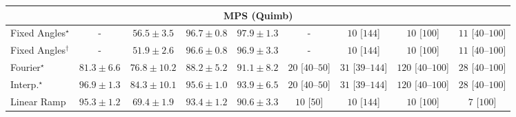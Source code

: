 \begin{tabular}{l|cccc|cccc|}
\cline{1-9}
\multicolumn{9}{c}{\rule{0pt}{8pt}MPS (Quimb)} \\
\midrule
Fixed Angles$^\star$ & {\cellcolor[HTML]{000000}} \color[HTML]{F1F1F1} {\cellcolor{white}} \color{black} - & {\cellcolor[HTML]{FFF9C5}} \color[HTML]{000000} $56.5\pm 3.5$ & {\cellcolor[HTML]{712806}} \color[HTML]{F1F1F1} $96.7\pm 0.8$ & {\cellcolor[HTML]{662506}} \color[HTML]{F1F1F1} $97.9\pm 1.3$ & {\cellcolor[HTML]{000000}} \color[HTML]{F1F1F1} {\cellcolor{white}} \color{black} - & {\cellcolor[HTML]{FFF7F3}} \color[HTML]{000000} $10$ [$144$] & {\cellcolor[HTML]{FFF7F3}} \color[HTML]{000000} $10$ [$100$] & {\cellcolor[HTML]{FFF6F2}} \color[HTML]{000000} $11$ [$40$--$100$] \\
Fixed Angles$^\dagger$ & {\cellcolor[HTML]{000000}} \color[HTML]{F1F1F1} {\cellcolor{white}} \color{black} - & {\cellcolor[HTML]{FFFFE5}} \color[HTML]{000000} $51.9\pm 2.6$ & {\cellcolor[HTML]{712806}} \color[HTML]{F1F1F1} $96.6\pm 0.8$ & {\cellcolor[HTML]{702806}} \color[HTML]{F1F1F1} $96.9\pm 3.3$ & {\cellcolor[HTML]{000000}} \color[HTML]{F1F1F1} {\cellcolor{white}} \color{black} - & {\cellcolor[HTML]{FFF7F3}} \color[HTML]{000000} $10$ [$144$] & {\cellcolor[HTML]{FFF7F3}} \color[HTML]{000000} $10$ [$100$] & {\cellcolor[HTML]{FFF6F2}} \color[HTML]{000000} $11$ [$40$--$100$] \\
Fourier$^\star$ & {\cellcolor[HTML]{E86C12}} \color[HTML]{F1F1F1} $81.3\pm 6.6$ & {\cellcolor[HTML]{F88B22}} \color[HTML]{F1F1F1} $76.8\pm 10.2$ & {\cellcolor[HTML]{BC4503}} \color[HTML]{F1F1F1} $88.2\pm 5.2$ & {\cellcolor[HTML]{A33904}} \color[HTML]{F1F1F1} $91.1\pm 8.2$ & {\cellcolor[HTML]{FFF4F0}} \color[HTML]{000000} $20$ [$40$--$50$] & {\cellcolor[HTML]{FFF2EE}} \color[HTML]{000000} $31$ [$39$--$144$] & {\cellcolor[HTML]{FDDCD8}} \color[HTML]{000000} $120$ [$40$--$100$] & {\cellcolor[HTML]{FFF3EF}} \color[HTML]{000000} $28$ [$40$--$100$] \\
Interp.$^\star$ & {\cellcolor[HTML]{702806}} \color[HTML]{F1F1F1} $96.9\pm 1.3$ & {\cellcolor[HTML]{D85A09}} \color[HTML]{F1F1F1} $84.3\pm 10.1$ & {\cellcolor[HTML]{7B2B05}} \color[HTML]{F1F1F1} $95.6\pm 1.0$ & {\cellcolor[HTML]{892F05}} \color[HTML]{F1F1F1} $93.9\pm 6.5$ & {\cellcolor[HTML]{FFF4F0}} \color[HTML]{000000} $20$ [$40$--$50$] & {\cellcolor[HTML]{FFF2EE}} \color[HTML]{000000} $31$ [$39$--$144$] & {\cellcolor[HTML]{FDDCD8}} \color[HTML]{000000} $120$ [$40$--$100$] & {\cellcolor[HTML]{FFF3EF}} \color[HTML]{000000} $28$ [$40$--$100$] \\
Linear Ramp & {\cellcolor[HTML]{7C2C05}} \color[HTML]{F1F1F1} $95.3\pm 1.2$ & {\cellcolor[HTML]{FEC24D}} \color[HTML]{000000} $69.4\pm 1.9$ & {\cellcolor[HTML]{8E3104}} \color[HTML]{F1F1F1} $93.4\pm 1.2$ & {\cellcolor[HTML]{A83B03}} \color[HTML]{F1F1F1} $90.6\pm 3.3$ & {\cellcolor[HTML]{FFF7F3}} \color[HTML]{000000} $10$ [$50$] & {\cellcolor[HTML]{FFF7F3}} \color[HTML]{000000} $10$ [$144$] & {\cellcolor[HTML]{FFF7F3}} \color[HTML]{000000} $10$ [$100$] & {\cellcolor[HTML]{FFF7F3}} \color[HTML]{000000} $7$ [$100$] \\

\end{tabular}
